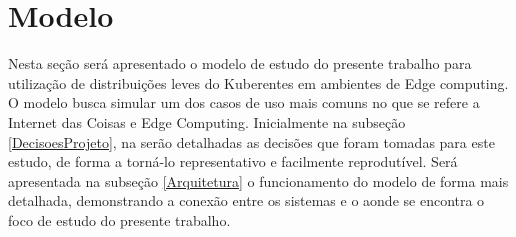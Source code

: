 \section{Modelo} \label{Modelo}

Nesta seção será apresentado o modelo de estudo do presente trabalho para utilização de distribuições leves do Kuberentes em ambientes de Edge computing. O modelo busca simular um dos casos de uso mais comuns no que se refere a Internet das Coisas e Edge Computing. Inicialmente na subseção \ref{DecisoesProjeto}, na serão detalhadas as decisões que foram tomadas para este estudo, de forma a torná-lo representativo e facilmente reprodutível. Será apresentada na subseção \ref{Arquitetura} o funcionamento do modelo de forma mais detalhada, demonstrando a conexão entre os sistemas e o aonde se encontra o foco de estudo do presente trabalho.



